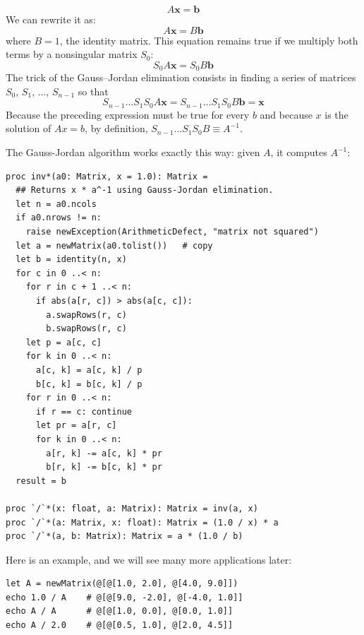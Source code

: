 \documentclass[justified, sixbynine]{tufte-book}
\def\ft{\small\tt}
\theoremstyle{plain}%
\newtheorem * {corollary}{Corollary}
\theoremstyle{definition}
\theoremstyle{remark}
\newtheorem * {remark}{Remark}
\newtheorem * {note}{Note}
\begin{document}
\begin{fullwidth}
\begin{equation}
A \mathbf{x} = \mathbf{b}
\end{equation}
We can rewrite it as:
\begin{equation}
A \mathbf{x} = B \mathbf{b}
\end{equation}
where $B=1$, the identity matrix. This equation remains true if we multiply both terms by a nonsingular matrix $S_0$:
\begin{equation}
S_0 A \mathbf{x} = S_0 B \mathbf{b}
\end{equation}
The trick of the Gauss--Jordan elimination consists in finding a series of matrices $S_0$, $S_1$, ..., $S_{n-1}$ so that
\begin{equation}
S_{n-1} ... S_1 S_0 A \mathbf{x} = S_{n-1} ... S_1 S_0 B \mathbf{b} = \mathbf{x}
\end{equation}
Because the preceding expression must be true for every $b$ and because $x$ is the solution of $A x=b$, by definition, 
$S_{n-1} \ldots S_1 S_0 B \equiv A^{-1}$.

The Gauss-Jordan algorithm works exactly this way: given $A$, it computes $A^{-1}$:

\begin{lstlisting}[caption={in file: {\ft nlib.nim}}]
proc inv*(a0: Matrix, x = 1.0): Matrix =
  ## Returns x * a^-1 using Gauss-Jordan elimination.
  let n = a0.ncols
  if a0.nrows != n:
    raise newException(ArithmeticDefect, "matrix not squared")
  let a = newMatrix(a0.tolist())   # copy
  let b = identity(n, x)
  for c in 0 ..< n:
    for r in c + 1 ..< n:
      if abs(a[r, c]) > abs(a[c, c]):
        a.swapRows(r, c)
        b.swapRows(r, c)
    let p = a[c, c]
    for k in 0 ..< n:
      a[c, k] = a[c, k] / p
      b[c, k] = b[c, k] / p
    for r in 0 ..< n:
      if r == c: continue
      let pr = a[r, c]
      for k in 0 ..< n:
        a[r, k] -= a[c, k] * pr
        b[r, k] -= b[c, k] * pr
  result = b

proc `/`*(x: float, a: Matrix): Matrix = inv(a, x)
proc `/`*(a: Matrix, x: float): Matrix = (1.0 / x) * a
proc `/`*(a, b: Matrix): Matrix = a * (1.0 / b)
\end{lstlisting}

Here is an example, and we will see many more applications later:

\begin{lstlisting}
let A = newMatrix(@[@[1.0, 2.0], @[4.0, 9.0]])
echo 1.0 / A    # @[@[9.0, -2.0], @[-4.0, 1.0]]
echo A / A      # @[@[1.0, 0.0], @[0.0, 1.0]]
echo A / 2.0    # @[@[0.5, 1.0], @[2.0, 4.5]]
\end{lstlisting}


\end{fullwidth}
\end{document}
